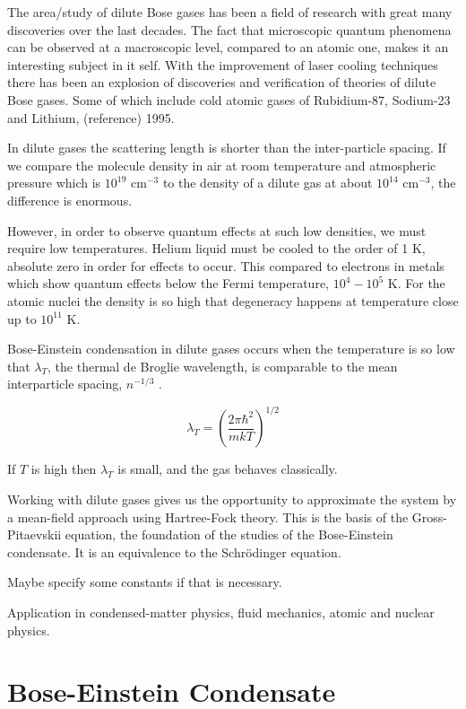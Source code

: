 The area/study of dilute Bose gases has been a field of research with great many discoveries over the last decades. The fact that microscopic quantum phenomena can be observed at a macroscopic level, compared to an atomic one, makes it an interesting subject in it self. With the improvement of laser cooling techniques there has been an explosion of discoveries and verification of theories of dilute Bose gases. Some of which include cold atomic gases of Rubidium-87, Sodium-23 and Lithium, (reference) 1995.

In dilute gases the scattering length is shorter than the inter-particle spacing. If we compare the molecule density in air at room temperature and atmospheric pressure which is $10^{19}$ cm$^{-3}$ to the density of a dilute gas at about $10^{14}$ cm$^{-3}$, the difference is enormous.

However, in order to observe quantum effects at such low densities, we must require low temperatures. Helium liquid must be cooled to the order of 1 K, absolute zero in order for effects to occur. This compared to electrons in metals which show quantum effects below the Fermi temperature, $10^4 - 10^5$ K. 
For the atomic nuclei the density is so high that degeneracy happens at temperature close up to $10^{11}$ K.

Bose-Einstein condensation in dilute gases occurs when the temperature is so low that $\lambda_T$, the thermal de Broglie wavelength, is comparable to the mean interparticle spacing, $n^{-1/3}$ \cite{BECCondInDilute}.

\begin{equation}
\lambda_T = \left( \frac{2 \pi \hbar^2}{m k T} \right)^{1/2}
\end{equation}

If $T$ is high then $\lambda_T$ is small, and the gas behaves classically. 

Working with dilute gases gives us the opportunity to approximate the system by a mean-field approach using Hartree-Fock theory. This is the basis of the Gross-Pitaevskii equation, the foundation of the studies of the Bose-Einstein condensate. It is an equivalence to the Schrödinger equation.

Maybe specify some constants if that is necessary. 

Application in condensed-matter physics, fluid mechanics, atomic and nuclear physics.

\section{Bose-Einstein Condensate}

